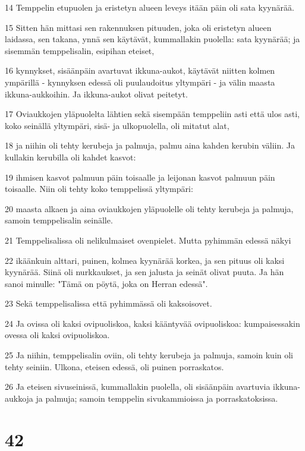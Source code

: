 \par 14 Temppelin etupuolen ja eristetyn alueen leveys itään päin oli sata kyynärää.
\par 15 Sitten hän mittasi sen rakennuksen pituuden, joka oli eristetyn alueen laidassa, sen takana, ynnä sen käytävät, kummallakin puolella: sata kyynärää; ja sisemmän temppelisalin, esipihan eteiset,
\par 16 kynnykset, sisäänpäin avartuvat ikkuna-aukot, käytävät niitten kolmen ympärillä - kynnyksen edessä oli puulaudoitus yltympäri - ja välin maasta ikkuna-aukkoihin. Ja ikkuna-aukot olivat peitetyt.
\par 17 Oviaukkojen yläpuolelta lähtien sekä sisempään temppeliin asti että ulos asti, koko seinällä yltympäri, sisä- ja ulkopuolella, oli mitatut alat,
\par 18 ja niihin oli tehty kerubeja ja palmuja, palmu aina kahden kerubin väliin. Ja kullakin kerubilla oli kahdet kasvot:
\par 19 ihmisen kasvot palmuun päin toisaalle ja leijonan kasvot palmuun päin toisaalle. Niin oli tehty koko temppelissä yltympäri:
\par 20 maasta alkaen ja aina oviaukkojen yläpuolelle oli tehty kerubeja ja palmuja, samoin temppelisalin seinälle.
\par 21 Temppelisalissa oli nelikulmaiset ovenpielet. Mutta pyhimmän edessä näkyi
\par 22 ikäänkuin alttari, puinen, kolmea kyynärää korkea, ja sen pituus oli kaksi kyynärää. Siinä oli nurkkaukset, ja sen jalusta ja seinät olivat puuta. Ja hän sanoi minulle: "Tämä on pöytä, joka on Herran edessä".
\par 23 Sekä temppelisalissa että pyhimmässä oli kaksoisovet.
\par 24 Ja ovissa oli kaksi ovipuoliskoa, kaksi kääntyvää ovipuoliskoa: kumpaisessakin ovessa oli kaksi ovipuoliskoa.
\par 25 Ja niihin, temppelisalin oviin, oli tehty kerubeja ja palmuja, samoin kuin oli tehty seiniin. Ulkona, eteisen edessä, oli puinen porraskatos.
\par 26 Ja eteisen sivuseinissä, kummallakin puolella, oli sisäänpäin avartuvia ikkuna-aukkoja ja palmuja; samoin temppelin sivukammioissa ja porraskatoksissa.

\chapter{42}

